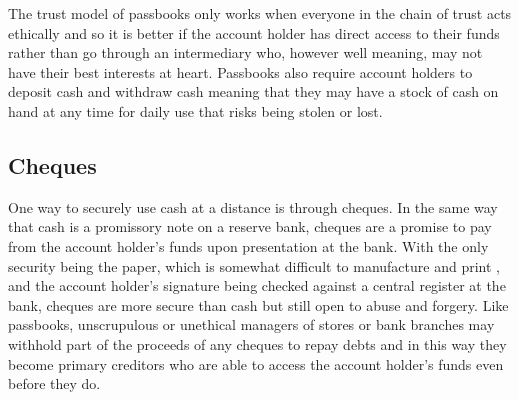 The trust model of passbooks only works when everyone in the chain of trust acts ethically and so it is better if the account holder has direct access to their funds rather than go through an intermediary who, however well meaning, may not have their best interests at heart. Passbooks also require account holders to deposit cash and withdraw cash meaning that they may have a stock of cash on hand at any time for daily use that risks being stolen or  lost.

\subsection{Cheques}
One way to securely use cash at a distance is through cheques. In the same way that cash is a promissory note on a reserve bank, cheques are a promise to pay from the account holder's funds upon presentation at the bank. With the only security being the paper, which is somewhat difficult to manufacture and print , and the account holder's signature being checked against a central register at the bank, cheques are more secure than cash but still open to abuse and forgery. Like passbooks, unscrupulous or unethical managers of stores or bank branches may withhold part of the proceeds of any cheques to repay debts and in this way they become primary creditors who are able to access the account holder's funds even before they do. 

